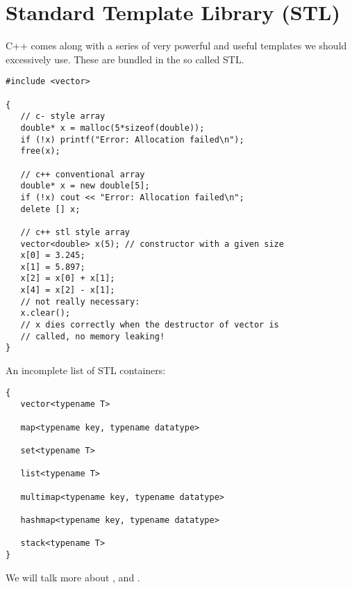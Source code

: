 \section{Standard Template Library (STL)}
C++ comes along with a series of very powerful and useful templates we should
excessively use. These are bundled in the so called STL.\\
\begin{boxedminipage}{\linewidth}
\begin{verbatim}
#include <vector>

{
   // c- style array
   double* x = malloc(5*sizeof(double));
   if (!x) printf("Error: Allocation failed\n");
   free(x);

   // c++ conventional array
   double* x = new double[5];
   if (!x) cout << "Error: Allocation failed\n";
   delete [] x;

   // c++ stl style array
   vector<double> x(5); // constructor with a given size
   x[0] = 3.245;
   x[1] = 5.897;
   x[2] = x[0] + x[1];
   x[4] = x[2] - x[1];
   // not really necessary:
   x.clear();
   // x dies correctly when the destructor of vector is
   // called, no memory leaking!
}
\end{verbatim}
\end{boxedminipage}
An incomplete list of STL containers:\\
\begin{boxedminipage}{\linewidth}
\begin{verbatim}
{
   vector<typename T>

   map<typename key, typename datatype>

   set<typename T>

   list<typename T>

   multimap<typename key, typename datatype>

   hashmap<typename key, typename datatype>

   stack<typename T>
}
\end{verbatim}
\end{boxedminipage}
We will talk more about ,  and .

